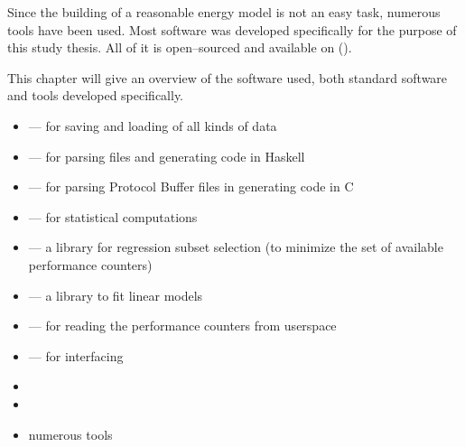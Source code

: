 \label{sec:tools}

Since the building of a reasonable energy model is not an easy task, numerous
tools have been used. Most software was developed specifically for the purpose
of this study thesis. All of it is open--sourced and available on
().

This chapter will give an overview of the software used, both standard software
and tools developed specifically.


\label{sec:standard-software}

\begin{itemize}

\item \JWTLprotobuf{} --- for saving and loading of all kinds of data

\item
{}
{} --- for parsing \JWTprotobuf{} files and generating
code in Haskell

\item {} ---
for parsing Protocol Buffer files in generating code in C

\item \JWTLR{} --- for statistical computations

\item {}
--- a \JWTR{} library for regression subset selection (to minimize the set of
available performance counters)

\item
{}
{} --- a \JWTR{} library to fit linear models

\item {}
{} --- for reading the performance counters from userspace

\item \JWTLnidaqmxbase{} --- for interfacing \JWPni

\item {}

\item {}

\item numerous  tools

\end{itemize}


